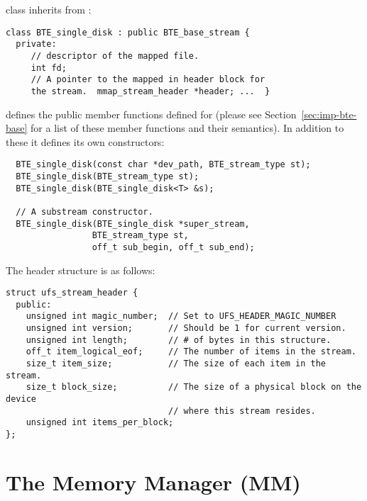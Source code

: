  class inherits from
:
\begin{verbatim}
class BTE_single_disk : public BTE_base_stream { 
  private:
     // descriptor of the mapped file.  
     int fd;
     // A pointer to the mapped in header block for
     the stream.  mmap_stream_header *header; ...  }
\end{verbatim}

 defines the public member
functions defined for  (please see
Section~\ref{sec:imp-bte-base} for a list of these member
functions and their semantics).  In addition to these it
defines its own constructors: 
\begin{verbatim}
  BTE_single_disk(const char *dev_path, BTE_stream_type st); 
  BTE_single_disk(BTE_stream_type st); 
  BTE_single_disk(BTE_single_disk<T> &s); 
  
  // A substream constructor.
  BTE_single_disk(BTE_single_disk *super_stream,
                 BTE_stream_type st,
                 off_t sub_begin, off_t sub_end);
\end{verbatim}
The  header structure is as follows:
\begin{verbatim}
struct ufs_stream_header { 
  public:
    unsigned int magic_number;  // Set to UFS_HEADER_MAGIC_NUMBER
    unsigned int version;       // Should be 1 for current version.
    unsigned int length;        // # of bytes in this structure.
    off_t item_logical_eof;     // The number of items in the stream.
    size_t item_size;           // The size of each item in the stream.
    size_t block_size;          // The size of a physical block on the device
                                // where this stream resides.
    unsigned int items_per_block;
};
\end{verbatim}




\section{The Memory Manager (MM)}

